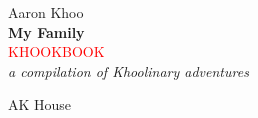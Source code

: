 
\newcommand*{\publisherlogo}{\fbox{$\mathcal{AK}$}} %
\newcommand*{\titleTH}{\begingroup %
\raggedleft %
\vspace*{\baselineskip} %

{\Large Aaron Khoo}\\[0.167\textheight] %

{\LARGE\bfseries My Family}\\[\baselineskip] %

{\textcolor{Red}{\Huge KHOOKBOOK}}\\[\baselineskip] %

{\Large \textit{a compilation of Khoolinary adventures}}\par %

\vfill %

{\large AK House \publisherlogo}\par %

\vspace*{3\baselineskip} %
\endgroup}

\pagestyle{empty} %

\titleTH %
\clearpage

\newpage\null\thispagestyle{empty}\newpage %

